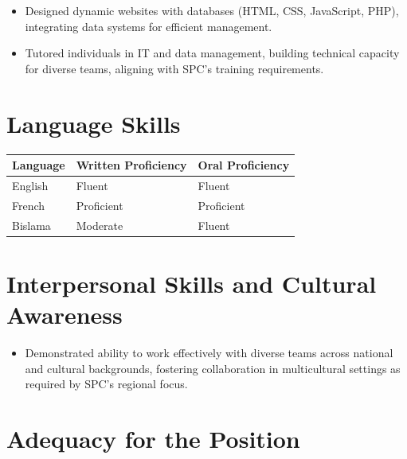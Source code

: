 \documentclass[
  letterpaper,
  DIV=11,
  numbers=noendperiod]{scrartcl}
\providecommand{\tightlist}{%
  \setlength{\itemsep}{0pt}\setlength{\parskip}{0pt}}
\begin{document}
\begin{itemize}
\tightlist
\item
  Designed dynamic websites with databases (HTML, CSS, JavaScript, PHP),
  integrating data systems for efficient management.\\
\item
  Tutored individuals in IT and data management, building technical
  capacity for diverse teams, aligning with SPC's training requirements.
\end{itemize}

\section{Language Skills}\label{language-skills}

\begin{longtable}[]{@{}lll@{}}
\toprule\noalign{}
Language & Written Proficiency & Oral Proficiency \\
\midrule\noalign{}
\endhead
\bottomrule\noalign{}
\endlastfoot
English & Fluent & Fluent \\
French & Proficient & Proficient \\
Bislama & Moderate & Fluent \\
\end{longtable}

\section{Interpersonal Skills and Cultural
Awareness}\label{interpersonal-skills-and-cultural-awareness}

\begin{itemize}
\tightlist
\item
  Demonstrated ability to work effectively with diverse teams across
  national and cultural backgrounds, fostering collaboration in
  multicultural settings as required by SPC's regional focus.
\end{itemize}

\section{Adequacy for the Position}\label{adequacy-for-the-position}
\end{document}
